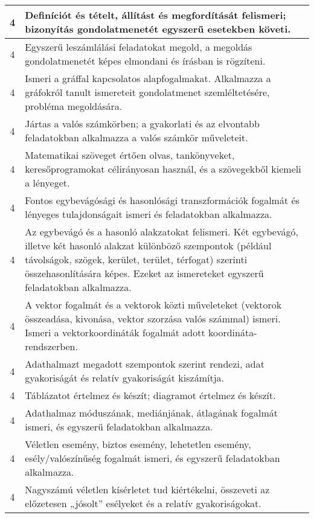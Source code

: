 \begin{longtable}{c | p{} }
                                
                                          4 &  Definíciót és tételt, állítást és megfordítását felismeri; bizonyítás gondolatmenetét egyszerű esetekben követi. \\ \hline
                                          4 &  Egyszerű leszámlálási feladatokat megold, a megoldás gondolatmenetét képes elmondani és írásban is rögzíteni. \\ \hline
                                          4 &  Ismeri a gráffal kapcsolatos alapfogalmakat. Alkalmazza a gráfokról tanult ismereteit gondolatmenet szemléltetésére, probléma megoldására. \\ \hline
                                          4 &  Jártas a valós számkörben; a gyakorlati és az elvontabb feladatokban alkalmazza a valós számkör műveleteit. \\ \hline
                                          4 &  Matematikai szöveget értően olvas, tankönyveket, keresőprogramokat célirányosan használ, és a szövegekből kiemeli a lényeget. \\ \hline
                                          4 &  Fontos egybevágósági és hasonlósági transzformációk fogalmát  és lényeges tulajdonságait ismeri és feladatokban alkalmazza. \\ \hline
                                          4 &  Az egybevágó és a hasonló alakzatokat felismeri. Két egybevágó, illetve két hasonló alakzat különböző szempontok (például távolságok, szögek, kerület, terület, térfogat) szerinti összehasonlítására képes. Ezeket az ismereteket egyszerű feladatokban alkalmazza. \\ \hline
                                          4 &  A vektor fogalmát és a vektorok közti műveleteket (vektorok összeadása, kivonása, vektor szorzása valós számmal) ismeri. Ismeri a vektorkoordináták fogalmát adott koordináta-rendszerben. \\ \hline
                                          4 &  Adathalmazt megadott szempontok szerint rendezi, adat gyakoriságát és relatív gyakoriságát kiszámítja. \\ \hline
                                          4 &  Táblázatot értelmez és készít; diagramot értelmez és készít. \\ \hline
                                          4 &  Adathalmaz móduszának, mediánjának, átlagának fogalmát ismeri, és egyszerű feladatokban alkalmazza. \\ \hline
                                          4 &  Véletlen esemény, biztos esemény, lehetetlen esemény, esély/valószínűség fogalmát ismeri, és egyszerű feladatokban alkalmazza. \\ \hline
                                          4 &  Nagyszámú véletlen kísérletet tud kiértékelni, összeveti az előzetesen „jósolt” esélyeket és a relatív gyakoriságokat. \\ \hline
                                      
                        \end{longtable}
            \clearpage


